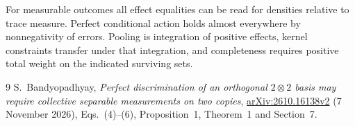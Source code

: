 \documentclass[11pt]{article}
\begin{document}
For measurable outcomes all effect equalities can be read for densities relative to trace measure. Perfect conditional action holds almost everywhere by nonnegativity of errors. Pooling is integration of positive effects, kernel constraints transfer under that integration, and completeness requires positive total weight on the indicated surviving sets.

\begin{thebibliography}{9}
 S.~Bandyopadhyay, \emph{Perfect discrimination of an orthogonal $2\otimes2$ basis may require collective separable measurements on two copies}, \href{https://arxiv.org/abs/2610.16138v2}{arXiv:2610.16138v2} (7 November 2026), Eqs.~(4)--(6), Proposition~1, Theorem~1 and Section~7.
\end{thebibliography}
\end{document}
